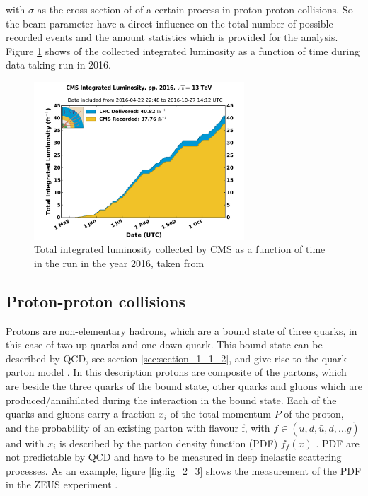 with $\sigma$ as the cross section of of a certain process in proton-proton collisions. So the beam parameter have a direct influence on the total number of possible recorded events and the amount statistics which is provided for the analysis. Figure \ref{fig:fig_2_2} shows of the collected integrated luminosity as a function of time during  data-taking run in 2016. 

\begin{figure}[ht]
	\centering
	\includegraphics[width=0.7\textwidth]{pictures/int_lumi_per_day_cumulative_pp_2016.pdf}

	\caption[Total integrated luminosity of the year 2016]{Total integrated luminosity collected by \gls{CMS} as a function of time in the run in the year 2016, taken from \cite{CMSLUMI}}
	\label{fig:fig_2_2}
\end{figure}


\subsection{Proton-proton collisions}
\label{sec:section_2_1_2}

Protons are non-elementary hadrons, which are a bound state of three quarks, in this case of two up-quarks and one down-quark. This bound state can be described by \gls{QCD}, see section \ref{sec:section_1_1_2}, and give rise to the quark-parton model \cite{Peskin}. In this description protons are composite of the partons, which are beside the three quarks of the bound state, other quarks and gluons which are produced/annihilated during the interaction in the bound state. Each of the quarks and gluons carry a fraction $x_{i}$ of the total momentum $P$ of the proton, and the probability of an existing parton with flavour f, with $f \in (u, d, \bar{u}, \bar{d}, ... g)$ and with $x_{i}$ is described by the parton density function (\gls{PDF}) $f_{f}(x)$ \cite{Peskin, PDF1}. \gls{PDF} are not predictable by \gls{QCD} and have to be measured in deep inelastic scattering processes. As an example, figure \ref{fig:fig_2_3} shows the measurement of the \gls{PDF} in the ZEUS experiment \cite{ZEUS}. \\

